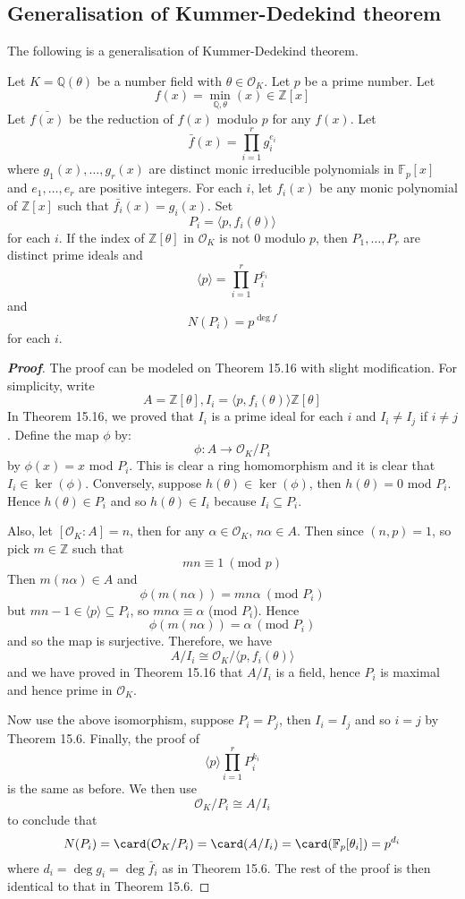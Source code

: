 \subsection{Generalisation of Kummer-Dedekind theorem}
The following is a generalisation of Kummer-Dedekind theorem.
\begin{theorem} Let $K=\mathbb{Q}(\theta)$ be a number field with $\theta \in \mathcal{O}_K$. Let $p$ be a prime number. Let
$$f(x)=\min_{\mathbb{Q},\theta}(x) \in \mathbb{Z}[x]$$
Let $\bar{f(x)}$ be the reduction of $f(x)$ modulo $p$ for any $f(x)$. Let
$$\bar{f}(x)=\prod_{i=1}^r g^{e_i}_i$$
where $g_1(x),\ldots,g_r(x)$ are distinct monic irreducible polynomials in $\mathbb{F}_p[x]$ and $e_1,\ldots,e_r$ are positive integers. For each $i$, let $f_i(x)$ be any monic polynomial of $\mathbb{Z}[x]$ such that
$\bar{f_i}(x)=g_i(x)$. Set
$$P_i=\langle p, f_i(\theta) \rangle$$
for each $i$. If the index of $\mathbb{Z}[\theta]$ in $\mathcal{O}_K$ is not $0$ modulo $p$, then
$P_1,\ldots,P_r$ are distinct prime ideals and
$$\langle p \rangle=\prod_{i=1}^r P^{e_i}_i$$
and
$$N(P_i)=p^{\deg{f}}$$ for each $i$.
\end{theorem}
\begin{proof}[\bf Proof] The proof can be modeled on Theorem 15.16 with slight modification. For simplicity, write
$$A=\mathbb{Z}[\theta],I_i=\langle p,f_i(\theta) \rangle \mathbb{Z}[\theta]$$
In Theorem 15.16, we proved that $I_i$ is a prime ideal for each $i$ and $I_i \neq I_j$ if $i \neq j$.
Define the map $\phi$ by:
$$\phi: A \rightarrow \mathcal{O}_K/P_i$$
by $\phi(x)=x$ mod $P_i$. This is clear a ring homomorphism and it is clear that $I_i \in \ker{(\phi)}$.
Conversely, suppose $h(\theta) \in \ker{(\phi)}$, then $h(\theta)=0$ mod $P_i$. Hence $h(\theta) \in P_i$ and so
$h(\theta) \in I_i$ because $I_i \subseteq P_i$.

Also, let $[\mathcal{O}_K:A]=n$, then for any $\alpha \in \mathcal{O}_K$, $n\alpha \in A$.
Then since $(n,p)=1$, so pick $m \in \mathbb{Z}$ such that
$$mn \equiv 1~(\text{mod } p)$$
Then $m(n\alpha) \in A$ and
$$\phi(m (n\alpha))= mn \alpha~(\text{mod } P_i)$$
but $mn-1 \in \langle p \rangle \subseteq P_i$, so $mn \alpha \equiv \alpha$ (mod $P_i$). Hence
$$\phi(m (n\alpha))=\alpha~(\text{mod } P_i)$$
and so the map is surjective.
Therefore, we have
$$A/I_i \cong \mathcal{O}_K/\langle p,f_i(\theta) \rangle$$
and we have proved in Theorem 15.16 that $A/I_i$ is a field, hence $P_i$ is maximal and hence prime in $\mathcal{O}_K$.

Now use the above isomorphism, suppose $P_i =P_j$, then $I_i=I_j$ and so $i=j$ by Theorem 15.6.
Finally, the proof of
$$\langle p \rangle \prod_{i=1}^r P^{k_i}_i$$
is the same as before. We then use
$$\mathcal{O}_K/P_i \cong A/I_i$$
to conclude that
$$N(P_i)=\card(\mathcal{O}_K/P_i)=\card(A/I_i)=\card(\mathbb{F}_p[\theta_i])=p^{d_i}$$
where $d_i=\deg{g_i}=\deg{\bar{f}_i}$ as in Theorem 15.6. The rest of the proof is then identical to that in
Theorem 15.6.
\end{proof}

